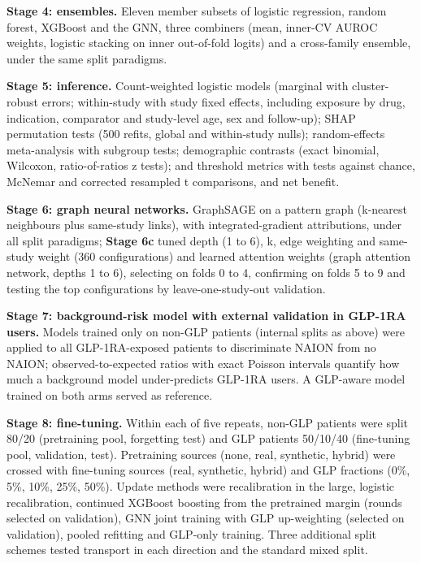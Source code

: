 \documentclass[journal]{IEEEtran}
\begin{document}
\textbf{Stage 4: ensembles.} Eleven member subsets of logistic
regression, random forest, XGBoost and the GNN, three combiners (mean,
inner-CV AUROC weights, logistic stacking on inner out-of-fold logits)
and a cross-family ensemble, under the same split paradigms.

\textbf{Stage 5: inference.} Count-weighted logistic models (marginal
with cluster-robust errors; within-study with study fixed effects,
including exposure by drug, indication, comparator and study-level age,
sex and follow-up); SHAP permutation tests (500 refits, global and
within-study nulls); random-effects meta-analysis with subgroup tests;
demographic contrasts (exact binomial, Wilcoxon, ratio-of-ratios z
tests); and threshold metrics with tests against chance, McNemar and
corrected resampled t comparisons, and net benefit.

\textbf{Stage 6: graph neural networks.} GraphSAGE on a pattern graph
(k-nearest neighbours plus same-study links), with integrated-gradient
attributions, under all split paradigms; \textbf{Stage 6c} tuned depth
(1 to 6), k, edge weighting and same-study weight (360 configurations)
and learned attention weights (graph attention network, depths 1 to 6),
selecting on folds 0 to 4, confirming on folds 5 to 9 and testing the
top configurations by leave-one-study-out validation.

\textbf{Stage 7: background-risk model with external validation in
GLP-1RA users.} Models trained only on non-GLP patients (internal splits
as above) were applied to all GLP-1RA-exposed patients to discriminate
NAION from no NAION; observed-to-expected ratios with exact Poisson
intervals quantify how much a background model under-predicts GLP-1RA
users. A GLP-aware model trained on both arms served as reference.

\textbf{Stage 8: fine-tuning.} Within each of five repeats, non-GLP
patients were split 80/20 (pretraining pool, forgetting test) and GLP
patients 50/10/40 (fine-tuning pool, validation, test). Pretraining
sources (none, real, synthetic, hybrid) were crossed with fine-tuning
sources (real, synthetic, hybrid) and GLP fractions (0\%, 5\%, 10\%,
25\%, 50\%). Update methods were recalibration in the large, logistic
recalibration, continued XGBoost boosting from the pretrained margin
(rounds selected on validation), GNN joint training with GLP
up-weighting (selected on validation), pooled refitting and GLP-only
training. Three additional split schemes tested transport in each
direction and the standard mixed split.
\end{document}
